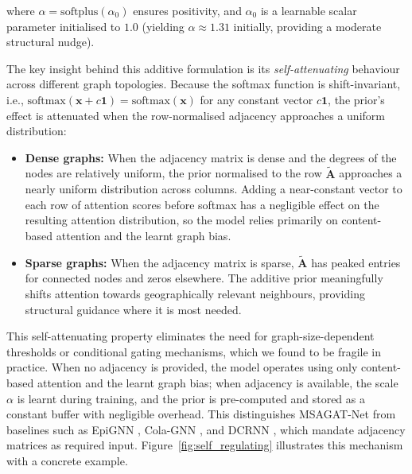 \documentclass[final,1p,times]{elsarticle}
\begin{document}
where $\alpha = \text{softplus}(\alpha_0)$ ensures positivity, and $\alpha_0$ is a learnable scalar parameter initialised to $1.0$ (yielding $\alpha \approx 1.31$ initially, providing a moderate structural nudge).

The key insight behind this additive formulation is its \emph{self-attenuating} behaviour across different graph topologies. Because the softmax function is shift-invariant, i.e., $\text{softmax}(\mathbf{x} + c\mathbf{1}) = \text{softmax}(\mathbf{x})$ for any constant vector $c\mathbf{1}$, the prior's effect is attenuated when the row-normalised adjacency approaches a uniform distribution:

\begin{itemize}
    \item \textbf{Dense graphs:} When the adjacency matrix is dense and the degrees of the nodes are relatively uniform, the prior normalised to the row $\tilde{\mathbf{A}}$ approaches a nearly uniform distribution across columns. Adding a near-constant vector to each row of attention scores before softmax has a negligible effect on the resulting attention distribution, so the model relies primarily on content-based attention and the learnt graph bias.
    \item \textbf{Sparse graphs:} When the adjacency matrix is sparse, $\tilde{\mathbf{A}}$ has peaked entries for connected nodes and zeros elsewhere. The additive prior meaningfully shifts attention towards geographically relevant neighbours, providing structural guidance where it is most needed.
\end{itemize}

This self-attenuating property eliminates the need for graph-size-dependent thresholds or conditional gating mechanisms, which we found to be fragile in practice. When no adjacency is provided, the model operates using only content-based attention and the learnt graph bias; when adjacency is available, the scale $\alpha$ is learnt during training, and the prior is pre-computed and stored as a constant buffer with negligible overhead. This distinguishes MSAGAT-Net from baselines such as EpiGNN \cite{xie2022epignn}, Cola-GNN \cite{dengColaGNNCrosslocationAttention2020a}, and DCRNN \cite{li2017diffusion}, which mandate adjacency matrices as required input. Figure~\ref{fig:self_regulating} illustrates this mechanism with a concrete example.
\end{document}
